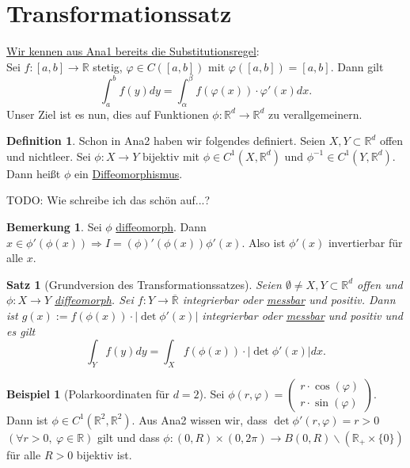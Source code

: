 \documentclass[a4paper]{report}
\newcommand{\R}{\mathbb{R}}
\newcommand{\Rq}{\overline{\R}}
\newcommand{\jlabel}[1]{\label{j_#1}}
\newcommand{\jhyperref}[2]{\hyperref[j_#1]{#2}}
\newcommand{\jlink}[1]{\jhyperref{#1}{#1}}
\newcommand{\jabb}[3]{ #1: #2 \rightarrow #3 }
\theoremstyle{plain}
\newtheorem*{satz*}{Satz}
\theoremstyle{definition}
\newtheorem*{defn*}{Definition}
\newtheorem*{expl*}{Beispiel}
\newtheorem*{bem*}{Bemerkung}
\begin{document}
{{{{    %
\section{Transformationssatz}
\uline{Wir kennen aus Ana1 bereits die Substitutionsregel}:\\
Sei $\jabb{f}{[a,b]}{\R}$ stetig, $\varphi \in C([a,b])$ mit $\varphi([a,b]) = [a,b]$. Dann gilt
\begin{displaymath}
    \int_a^b f(y) dy = \int_\alpha^\beta f(\varphi(x))\cdot \varphi'(x) dx.
\end{displaymath}
Unser Ziel ist es nun, dies auf Funktionen $\jabb{\phi}{\R^d}{\R^d}$ zu verallgemeinern.

\begin{defn*}
    \jlabel{Diffeomorphismus} \jlabel{diffeomorph}
    Schon in Ana2 haben wir folgendes definiert. Seien $X,Y\subset \R^d$ offen und nichtleer. Sei $\jabb{\phi}{X}{Y}$ bijektiv mit $\phi\in C^1(X,\R^d)$ und $\phi^{-1} \in C^1(Y,\R^d)$. Dann heißt $\phi$ ein \jlink{Diffeomorphismus}.
\end{defn*}

TODO: Wie schreibe ich das schön auf...?

\begin{bem*}
    Sei $\phi$ \jlink{diffeomorph}. Dann $x\in \phi'(\phi(x)) \Rightarrow I=(\phi)'(\phi(x))\phi'(x)$. Also ist $\phi'(x)$ invertierbar für alle $x$.
\end{bem*}


\begin{satz*}[Grundversion des Transformationssatzes]
    Seien $\emptyset \ne X,Y\subset \R^d$ offen und $\jabb{\phi}{X}{Y}$ \jlink{diffeomorph}. Sei $\jabb{f}{Y}{\Rq}$ integrierbar oder \jlink{messbar} und positiv. Dann ist $g(x):= f(\phi(x))\cdot |\det \phi'(x)|$ integrierbar oder \jlink{messbar} und positiv und es gilt
    \begin{displaymath}
        \int_Y f(y)dy = \int_X f(\phi(x)) \cdot |\det \phi'(x)|dx.
    \end{displaymath}
\end{satz*}

\begin{expl*}[Polarkoordinaten für $d=2$]
    Sei $\phi(r,\varphi) = \begin{pmatrix} r\cdot \cos (\varphi) \\ r\cdot \sin(\varphi)\end{pmatrix}$. Dann ist $\phi \in C^1(\R^2,\R^2)$. Aus Ana2 wissen wir, dass $\det \phi'(r,\varphi) = r > 0$ $(\forall r>0, \ \varphi \in \R)$ gilt und dass $\jabb{\phi}{(0,R)\times (0, 2\pi)}{B(0,R)\backslash (\R_+ \times \{0\})}$ für alle $R>0$ bijektiv ist.
    

\end{expl*}}}}}
\end{document}
